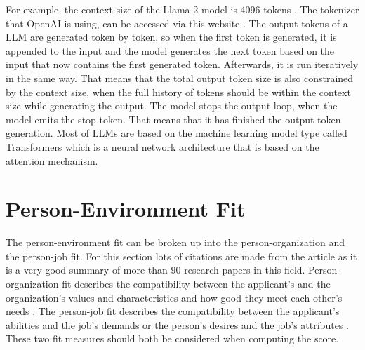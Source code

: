\documentclass[draft,final]{thesisclass} %
\begin{document}
For example, the context size of the Llama 2 model is 4096 tokens \cite[47]{llama2}.
The tokenizer that OpenAI is using, can be accessed via this website \cite{openai_tokenizer}.
The output tokens of a \acs{LLM} are generated token by token, so when the first token is generated, it is appended to the input and the model generates the next token based on the input that now contains the first generated token. Afterwards, it is run iteratively in the same way.
That means that the total output token size is also constrained by the context size, when the full history of tokens should be within the context size while generating the output.
The model stops the output loop, when the model emits the stop token. That means that it has finished the output token generation.
Most of \acs{LLM}s are based on the machine learning model type called Transformers \cite[1]{transformer} which is a neural network architecture that is based on the attention mechanism.

\section{Person-Environment Fit}
The person-environment fit can be broken up into the person-organization and the person-job fit.
For this section lots of citations are made from the article \cite{po_and_pj_fit_literature_review} as it is a very good summary of more than $90$ research papers in this field.
Person-organization fit describes the compatibility between the applicant's and the organization's values and characteristics and how good they meet each other's needs \cite[179]{po_and_pj_fit_literature_review}.
The person-job fit describes the compatibility between the applicant's abilities and the job's demands or the person's desires and the job's attributes \cite[179]{po_and_pj_fit_literature_review}.
These two fit measures should both be considered when computing the score.
\end{document}
